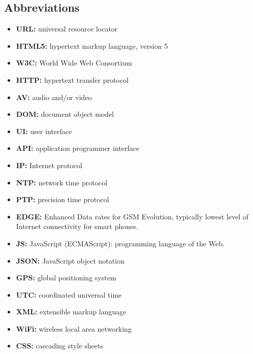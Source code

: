 \subsection{Abbreviations}

\begin{itemize}
\item{\textbf{URL:} universal resource locator}
\item{\textbf{HTML5:} hypertext markup language, version 5}
\item{\textbf{W3C:} World Wide Web Consortium}
\item{\textbf{HTTP:} hypertext transfer protocol}
\item{\textbf{AV:} audio and/or video}
\item{\textbf{DOM:} document object model}
\item{\textbf{UI:} user interface}
\item{\textbf{API:} application programmer interface}
\item{\textbf{IP:} Internet protocol}
\item{\textbf{NTP:} network time protocol}
\item{\textbf{PTP:} precision time protocol}
\item{\textbf{EDGE:} Enhanced Data rates for GSM Evolution, typically lowest level of Internet connectivity for smart phones.}
\item{\textbf{JS:}} JavaScript (ECMAScript): programming language of the Web.
\item{\textbf{JSON:} JavaScript object notation}
\item{\textbf{GPS:} global positioning system}
\item{\textbf{UTC:} coordinated universal time}
\item{\textbf{XML:} extensible markup language}
\item{\textbf{WiFi:} wireless local area networking}
\item{\textbf{CSS:}} cascading style sheets
\end{itemize}